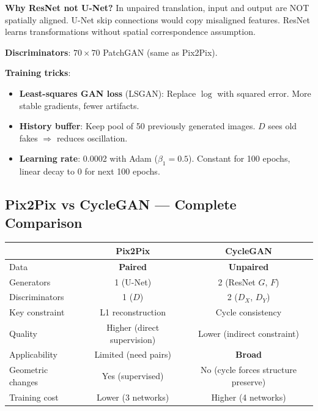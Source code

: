 \textbf{Why ResNet not U-Net?} In unpaired translation, input and output are NOT spatially aligned. U-Net skip connections would copy misaligned features. ResNet learns transformations without spatial correspondence assumption.

\textbf{Discriminators}: $70{\times}70$ PatchGAN (same as Pix2Pix).

\textbf{Training tricks}:
\begin{itemize}
\item \textbf{Least-squares GAN loss} (LSGAN): Replace $\log$ with squared error. More stable gradients, fewer artifacts.
\item \textbf{History buffer}: Keep pool of 50 previously generated images. $D$ sees old fakes $\Rightarrow$ reduces oscillation.
\item \textbf{Learning rate}: 0.0002 with Adam ($\beta_1{=}0.5$). Constant for 100 epochs, linear decay to 0 for next 100 epochs.
\end{itemize}

\subsection{Pix2Pix vs CycleGAN — Complete Comparison}
\begin{center}\small
\begin{tabular}{lcc}\toprule
& \textbf{Pix2Pix} & \textbf{CycleGAN} \\\midrule
Data & \textbf{Paired} & \textbf{Unpaired} \\
Generators & 1 (U-Net) & 2 (ResNet $G$, $F$) \\
Discriminators & 1 ($D$) & 2 ($D_X$, $D_Y$) \\
Key constraint & L1 reconstruction & Cycle consistency \\
Quality & Higher (direct supervision) & Lower (indirect constraint) \\
Applicability & Limited (need pairs) & \textbf{Broad} \\
Geometric changes & Yes (supervised) & No (cycle forces structure preserve) \\
Training cost & Lower (3 networks) & Higher (4 networks) \\
\bottomrule
\end{tabular}
\end{center}

